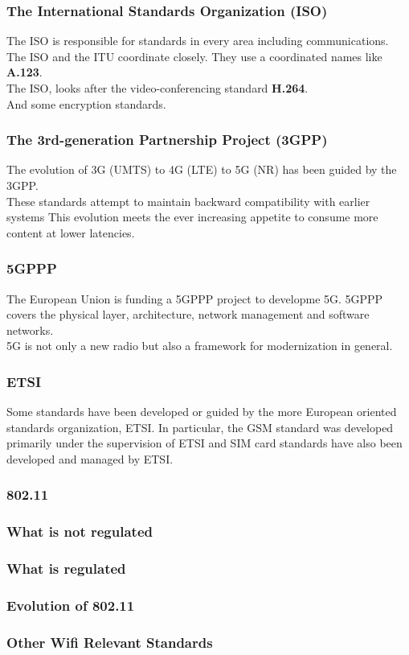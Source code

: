 \documentclass[18pt]{beamer}
\begin{document}
\begin{frame}\LARGE
\frametitle{The International Standards Organization (ISO)}
\large
The ISO is responsible for standards in every area
including communications.\\[4mm] 
The ISO and the ITU coordinate closely.
They use a coordinated names like {\bf A.123}.\\[4mm]
%
The ISO, looks after the video-conferencing standard {\bf H.264}.\\[4mm]
And some encryption standards.
\end{frame}

\begin{frame}\LARGE
\frametitle{The 3rd-generation Partnership Project (3GPP)}
The evolution of 3G (UMTS) to 4G (LTE) to 5G (NR) 
has been guided by the 3GPP.\\[3mm]
These standards attempt to maintain backward compatibility
with earlier systems
%
This evolution meets the ever increasing
appetite to consume more content at lower latencies.  
\end{frame}

\begin{frame}\LARGE
\frametitle{5GPPP}
The European Union is funding a 5GPPP project
to developme 5G. 5GPPP covers the physical layer,
architecture, network management and software networks.\\[3mm]
%
5G is not only a new radio but also a framework 
for modernization in general.\\[3mm]
\end{frame}

\begin{frame}\LARGE
\frametitle{ETSI}
Some standards have been developed or guided by the more European
oriented standards organization, ETSI. In particular, the GSM \cite{GSM}
standard was developed primarily under the supervision of ETSI and
SIM card standards have also been developed and managed by ETSI.
\end{frame}

\begin{frame}\LARGE
\frametitle{802.11}
\end{frame}

\begin{frame}\LARGE
\frametitle{What is not regulated}
\end{frame}

\begin{frame}\LARGE
\frametitle{What is regulated}
\end{frame}

\begin{frame}\LARGE
\frametitle{Evolution of 802.11}
\end{frame}

\begin{frame}\LARGE
\frametitle{Other Wifi Relevant Standards}
%


\end{frame}
\end{document}
